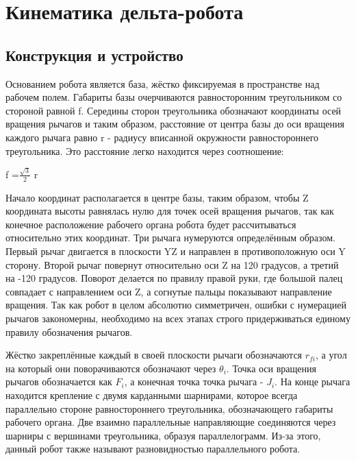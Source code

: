 \section{Кинематика дельта-робота}
\subsection{Конструкция и устройство}
Основанием робота является база, жёстко фиксируемая в пространстве над рабочем полем. Габариты базы очерчиваются равносторонним треугольником со стороной равной f. Середины сторон треугольника обозначают координаты осей вращения рычагов и таким образом, расстояние от центра базы до оси вращения каждого рычага равно r - радиусу вписанной окружности равностороннего треугольника. Это расстояние легко находится через соотношение:
\begin{center}
f =$\frac{\sqrt{3}}{2}$  r
\end{center}

Начало координат располагается в центре базы, таким образом, чтобы Z координата высоты равнялась нулю для точек осей вращения рычагов, так как конечное расположение рабочего органа робота будет рассчитываться относительно этих координат. Три рычага нумеруются определённым образом. Первый рычаг двигается в плоскости YZ и направлен в противоположную оси Y сторону. Второй рычаг повернут относительно оси Z на 120 градусов, а третий на -120 градусов. Поворот делается по правилу правой руки, где большой палец совпадает с направлением оси Z, а согнутые пальцы показывают направление вращения. Так как робот в целом абсолютно симметричен, ошибки с нумерацией рычагов закономерны, необходимо на всех этапах строго придерживаться единому правилу обозначения рычагов.

Жёстко закреплённые каждый в своей плоскости рычаги обозначаются $r_{fi}$, а угол на который они поворачиваются обозначают через $\theta_{i}$. Точка оси вращения рычагов обозначается как $F_{i}$, а конечная точка точка рычага - $J_{i}$. На конце рычага находится крепление с двумя карданными шарнирами, которое всегда параллельно стороне равностороннего треугольника, обозначающего габариты рабочего органа. Две взаимно параллельные направляющие соединяются через шарниры с вершинами треугольника, образуя параллелограмм. Из-за этого, данный робот также называют разновидностью параллельного робота.

